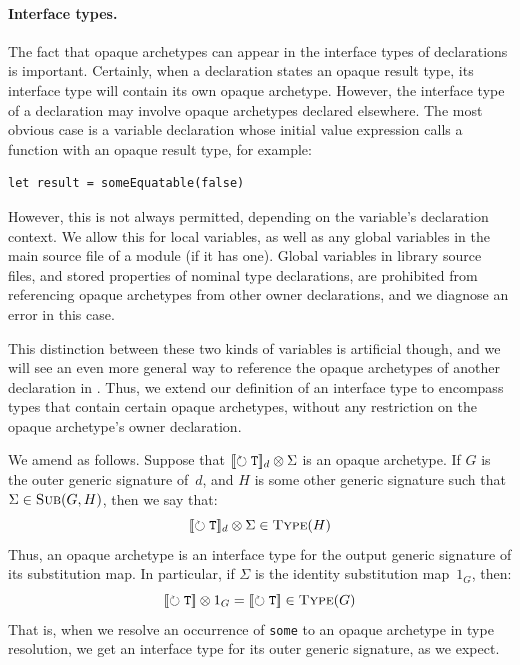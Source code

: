 \documentclass[../generics]{subfiles}
\begin{document}
\paragraph{Interface types.}
The fact that opaque archetypes can appear in the interface types of declarations is important. Certainly, when a declaration states an opaque result type, its interface type will contain its own opaque archetype. However, the interface type of a declaration may involve opaque archetypes declared elsewhere. The most obvious case is a variable declaration whose initial value expression calls a function with an opaque result type, for example:
\begin{Verbatim}
let result = someEquatable(false)
\end{Verbatim}
However, this is not always permitted, depending on the variable's declaration context. We allow this for local variables, as well as any global variables in the main source file of a module (if it has one). Global variables in library source files, and stored properties of nominal type declarations, are prohibited from referencing opaque archetypes from other owner declarations, and we diagnose an error in this case.

This distinction between these two kinds of variables is artificial though, and we will see an even more general way to reference the opaque archetypes of another declaration in . Thus, we extend our definition of an interface type to encompass types that contain certain opaque archetypes, without any restriction on the opaque archetype's owner declaration.

\begin{definition}
We amend  as follows. Suppose that $[\![\circlearrowright \texttt{\texttt{T}}]\!]_d \otimes \Sigma$ is an opaque archetype. If $G$ is the outer generic signature of~$d$, and $H$ is some other generic signature such that $\Sigma\in\textsc{Sub}({G, H})$, then we say that:
\[
[\![\circlearrowright \texttt{\texttt{T}}]\!]_d \otimes \Sigma \in \textsc{Type}({H})
\]
Thus, an opaque archetype is an interface type for the output generic signature of its substitution map. In particular, if $\Sigma$ is the identity substitution map~$1_G$, then:
\[
[\![\circlearrowright \texttt{\texttt{T}}]\!] \otimes 1_G = [\![\circlearrowright \texttt{\texttt{T}}]\!] \in \textsc{Type}({G})
\]
That is, when we resolve an occurrence of \texttt{some} to an opaque archetype in type resolution, we get an interface type for its outer generic signature, as we expect.
\end{definition}
\end{document}
